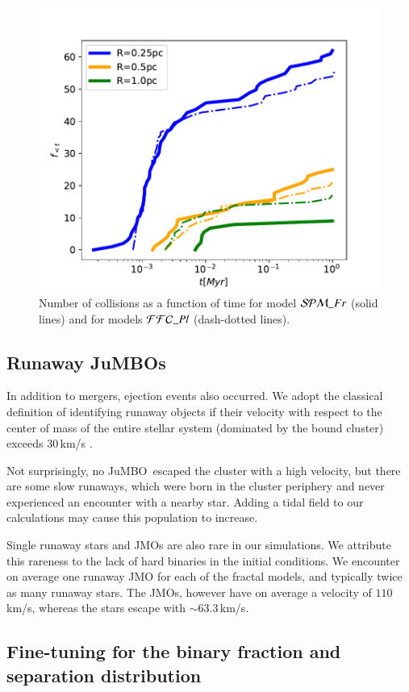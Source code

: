 \documentclass[submission,phys]{lib/SciPost}
\newcommand{\jumbo}{\mbox{JuMBO}}
\newcommand{\jumbos}{\mbox{JuMBOs}}
\begin{document}
\begin{figure}
\centering
    \includegraphics[width=0.75\columnwidth]{figures/fig_collision_evolution_ISF_Fr.pdf
    }
        \caption{Number of collisions as a function of time for model
          ${\cal SPM}\_Fr$ (solid lines) and for models ${\cal
            FFC}\_Pl$ (dash-dotted lines).}
         \label{Fig:collision_evolution_ISF_Fr}
\end{figure}

\subsection{Runaway \jumbos}

In addition to mergers, ejection events also occurred.  We adopt the
classical definition of identifying runaway objects if their velocity
with respect to the center of mass of the entire stellar system
(dominated by the bound cluster) exceeds 30\,km/s
\cite{1961BAN....15..265B}.

Not surprisingly, no \jumbo\, escaped the cluster with a high
velocity, but there are some slow runaways, which were born in the
cluster periphery and never experienced an encounter with a nearby
star. Adding a tidal field to our calculations may cause this
population to increase.

Single runaway stars and JMOs are also rare in our simulations. We
attribute this rareness to the lack of hard binaries in the initial
conditions.  We encounter on average one runaway JMO for each of the
fractal models, and typically twice as many runaway stars.  The JMOs,
however have on average a velocity of $110$\,km/s, whereas the stars
escape with $\sim 63.3$\,km/s.

\subsection{Fine-tuning for the binary fraction and separation distribution}\label{sect:finetuningbinary_fraction}
\end{document}
